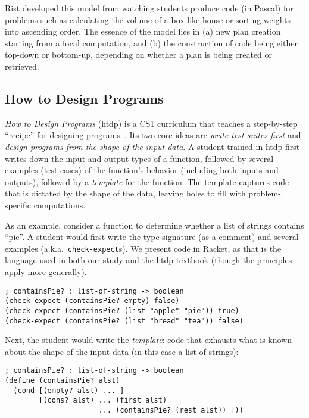 \documentclass{sig-alternate-05-2015}
\newcommand{\htdp}{{\sc htdp}\xspace}
\begin{document}
Rist developed this model from watching students produce code (in Pascal) for problems such as calculating the volume of a box-like house or sorting weights into ascending order. The essence of the model lies in (a) new plan creation starting from a focal computation, and (b) the construction of code being either top-down or bottom-up, depending on whether a plan is being created or retrieved.

\subsection{How to Design Programs}
\label{sec:htdp} 

\textit{How to Design Programs} (\htdp) is a CS1 curriculum that teaches a step-by-step ``recipe'' for designing programs~\cite{htdp}. Its two core ideas are \emph{write test suites first} and \emph{design programs from the shape of the input data}.  A student trained in \htdp first writes down the input and output types of a function, followed by several examples (test cases) of the function's behavior (including both inputs and outputs), followed by a \emph{template} for the function. The template captures code that is dictated by the shape of the data, leaving holes to fill with problem-specific computations. 

As an example, consider a function to determine whether a list of strings contains ``pie''.  A student would first write the type signature (as a comment) and several examples (a.k.a.\ \lstinline{check-expect}s). We present code in Racket, as that is the language used in both our study and the \htdp textbook (though the principles apply more generally).

\begin{lstlisting}
; containsPie? : list-of-string -> boolean
(check-expect (containsPie? empty) false)
(check-expect (containsPie? (list "apple" "pie")) true)
(check-expect (containsPie? (list "bread" "tea")) false)
\end{lstlisting}

\noindent
Next, the student would write the \emph{template}: code that exhausts what is known about the shape of the input data (in this case a list of strings):

\begin{lstlisting}
; containsPie? : list-of-string -> boolean
(define (containsPie? alst)
  (cond [(empty? alst) ... ]
        [(cons? alst) ... (first alst) 
                      ... (containsPie? (rest alst)) ]))
\end{lstlisting}
\label{code:template-example}
\end{document}
